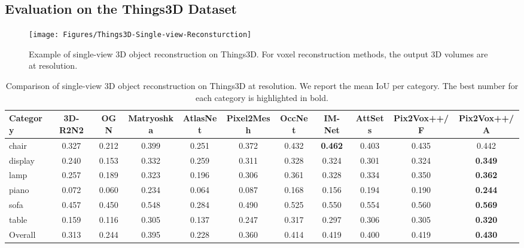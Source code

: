 \documentclass[twocolumn]{svjour3}
\begin{document}
\subsection{Evaluation on the Things3D Dataset}

\begin{figure*}
  \centering
  \resizebox{\linewidth}{!} {
    \texttt{[image: Figures/Things3D-Single-view-Reconsturction]}
  }
  \caption{Example of single-view 3D object reconstruction on Things3D. For voxel reconstruction methods, the output 3D volumes are at  resolution.}
  \label{fig:things3d-single-view-reconstruction}
\end{figure*}

\begin{table*}[!t]
  \caption{Comparison of single-view 3D object reconstruction on Things3D at  resolution. We report the mean IoU per category. The best number for each category is highlighted in bold.}
  \resizebox{\linewidth}{!} {
    \begin{tabular}{lcccccccccc}
      \toprule
      Category     & 3D-R2N2     & OGN        & Matryoshka
                   & AtlasNet    & Pixel2Mesh & OccNet
                   & IM-Net      & AttSets    
                   & Pix2Vox++/F & Pix2Vox++/A \\
      \midrule
      chair        & 0.327       & 0.212      & 0.399
                   & 0.251       & 0.372      & 0.432
                   & \bf{0.462}  & 0.403
                   & 0.435       & 0.442 \\
      display      & 0.240       & 0.153      & 0.332
                   & 0.259       & 0.311      & 0.328
                   & 0.324       & 0.301
                   & 0.324       & \bf{0.349} \\
      lamp         & 0.257       & 0.189      & 0.323
                   & 0.196       & 0.306      & 0.361
                   & 0.328       & 0.334
                   & 0.350       & \bf{0.362} \\
      piano        & 0.072       & 0.060      & 0.234
                   & 0.064       & 0.087      & 0.168
                   & 0.156       & 0.194
                   & 0.190       & \bf{0.244} \\
      sofa         & 0.457       & 0.450      & 0.548
                   & 0.284       & 0.490      & 0.525
                   & 0.550       & 0.554
                   & 0.560       & \bf{0.569} \\
      table        & 0.159       & 0.116      & 0.305
                   & 0.137       & 0.247      & 0.317
                   & 0.297       & 0.306
                   & 0.305       & \bf{0.320} \\
      \midrule
      Overall      & 0.313       & 0.244      & 0.395
                   & 0.228       & 0.360      & 0.414
                   & 0.419       & 0.400
                   & 0.419       & \bf{0.430} \\
      \bottomrule
    \end{tabular}
  }
  \label{tab:things3d-voxel-reconstruction-iou}
\end{table*}
\end{document}
